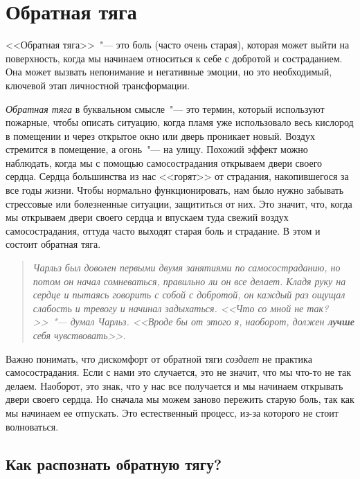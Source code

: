 
\chapter{Обратная тяга}\label{Backdraft}

<<Обратная тяга>>~"--- это боль (часто очень старая), которая может выйти на поверхность, когда мы начинаем относиться к себе с добротой и состраданием. Она может вызвать непонимание и негативные эмоции, но это необходимый, ключевой этап личностной трансформации.

\emph{Обратная тяга} в буквальном смысле~"--- это термин, который используют пожарные, чтобы описать ситуацию, когда пламя уже использовало весь кислород в помещении и через открытое окно или дверь проникает новый. Воздух стремится в помещение, а огонь~"--- на улицу.  Похожий эффект можно наблюдать, когда мы с помощью самосострадания открываем двери своего сердца. Сердца большинства из нас <<горят>> от страдания, накопившегося за все годы жизни. Чтобы нормально функционировать, нам было нужно забывать стрессовые или болезненные ситуации, защититься от них. Это значит, что, когда мы открываем двери своего сердца и впускаем туда свежий воздух самосострадания, оттуда часто выходят старая боль и страдание. В этом и состоит обратная тяга.

\begin{quotation}
	\textit{
		Чарльз был доволен первыми двумя занятиями по самосостраданию, но потом он начал сомневаться, правильно ли он все делает. Кладя руку на сердце и пытаясь говорить с собой с добротой, он каждый раз ощущал слабость и тревогу и начинал задыхаться. <<Что со мной не так?>>~"--- думал Чарльз. <<Вроде бы от этого я, наоборот, должен \textbf{лучше} себя чувствовать>>.
	}
\end{quotation}

Важно понимать, что дискомфорт от обратной тяги \emph{создает} не практика самосострадания. Если с нами это случается, это не значит, что мы что-то не так делаем. Наоборот, это знак, что у нас все получается и мы начинаем открывать двери своего сердца. Но сначала мы можем заново пережить старую боль, так как мы начинаем ее отпускать\cite{63}. Это естественный процесс, из-за которого не стоит волноваться.  

\section*{Как распознать обратную тягу?} \label{How_Do_We_Recognize_Backdraft?}

